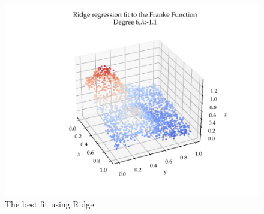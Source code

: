 \documentclass[11pt]{article}
\begin{document}
\begin{figure}
  \centering
  \includegraphics{figures/franke_function_Ridge_fit.pdf}
  \caption{The best fit using Ridge}
  \label{fig: Ridge_best_fit}
\end{figure}

\begin{center}
  \label{data: Ridge_best_fit}
\end{center}



\newpage
\newpage







\printbibliography
\end{document}
